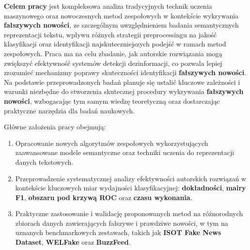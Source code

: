 \textbf{Celem pracy} jest kompleksowa analiza tradycyjnych technik uczenia maszynowego oraz nowoczesnych metod zespołowych w kontekście wykrywania \textbf{fałszywych nowości}, ze szczególnym uwzględnieniem badania semantycznych reprezentacji tekstu, wpływu różnych strategii preprocessingu na jakość klasyfikacji oraz identyfikacji najskuteczniejszych podejść w ramach metod zespołowych. Praca ma na celu zbadanie, jak autorskie rozwiązania mogą zwiększyć efektywność systemów detekcji dezinformacji, co pozwala lepiej zrozumieć mechanizmy poprawy skuteczności identyfikacji \textbf{fałszywych nowości}. Na podstawie przeprowadzonych badań planuje się ustalić kluczowe zależności i warunki niezbędne do stworzenia skutecznej procedury wykrywania \textbf{fałszywych nowości}, wzbogacając tym samym wiedzę teoretyczną oraz dostarczając praktyczne narzędzia dla badań naukowych.

Główne założenia pracy obejmują:

\begin{enumerate}
	\def\labelenumi{\arabic{enumi}.}
	\item
	      Opracowanie nowych algorytmów zespołowych wykorzystujących zaawansowane modele semantyczne oraz techniki uczenia do reprezentacji danych tekstowych.
	\item
	      Przeprowadzenie systematycznej analizy efektywności autorskich rozwiązań w kontekście kluczowych miar wydajności klasyfikacyjnej: \textbf{dokładności}, \textbf{mairy F1}, \textbf{obszaru pod krzywą ROC} oraz \textbf{czasu wykonania}.
	\item
	      Praktyczne zastosowanie i walidację proponowanych metod na różnorodnych zbiorach danych zawierających fałszywe i prawdziwe nowości, w tym na uznanych benchmarkowych zestawach, takich jak \textbf{ISOT Fake News Dataset}, \textbf{WELFake} oraz \textbf{BuzzFeed}.
\end{enumerate}

